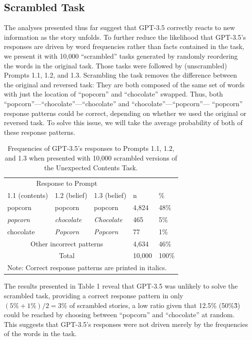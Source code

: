 \documentclass[11pt]{article}
\begin{document}
\subsection*{Scrambled Task}
The analyses presented thus far suggest that GPT-3.5 correctly reacts to new information as the story unfolds. To further reduce the likelihood that GPT-3.5’s responses are driven by word frequencies rather than facts contained in the task, we present it with 10,000 “scrambled” tasks generated by randomly reordering the words in the original task. Those tasks were followed by (unscrambled) Prompts 1.1, 1.2, and 1.3.
Scrambling the task removes the difference between the original and reversed task: They are both composed of the same set of words with just the location of “popcorn” and “chocolate” swapped. Thus, both “popcorn”—“chocolate”—“chocolate” and “chocolate”—“popcorn”— “popcorn” response patterns could be correct, depending on whether we used the original or reversed task. To solve this issue, we will take the average probability of both of these response patterns.
   \begin{table}
\centering
\begin{tabular}{lllll} 
\hline
\multicolumn{3}{c}{Response to Prompt}                     &        &         \\ 
\cline{1-3}
1.1 (contents)   & 1.2 (belief)       & 1.3 (belief)       & n      & \%      \\ 
\hline
popcorn          & popcorn            & popcorn            & 4,824  & 48\%    \\
\textit{popcorn} & \textit{chocolate} & \textit{Chocolate} & 465    & 5\%     \\
chocolate        & \textit{Popcorn}   & \textit{Popcorn}   & 77     & 1\%     \\
\multicolumn{3}{c}{Other incorrect patterns}               & 4,634  & 46\%    \\ 
\cline{4-5}
\multicolumn{3}{c}{Total}                                  & 10,000 & 100\%   \\ 
\hline
\multicolumn{5}{l}{Note: Correct response patterns are printed in italics.}   
\end{tabular}
\caption{Frequencies of GPT-3.5’s responses to Prompts 1.1, 1.2, and 1.3 when presented with 10,000 scrambled versions of the Unexpected Contents Task.}
\end{table}

The results presented in Table 1 reveal that GPT-3.5 was unlikely to solve the scrambled task, providing a correct response pattern in only $(5\%+1\%)/2 = 3\%$ of scrambled stories, a low ratio given that 12.5\% (50\%\^3) could be reached by choosing between “popcorn” and “chocolate” at random. This suggests that GPT-3.5’s responses were not driven merely by the frequencies of the words in the task.
\end{document}
